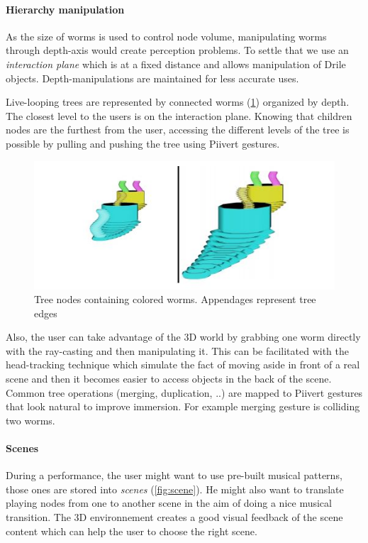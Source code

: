 \paragraph{Hierarchy manipulation}  
As the size of worms is used to control node volume, manipulating worms through depth-axis would create perception problems. To settle that we use an \textit{interaction plane} which is at a fixed distance and allows manipulation of Drile objects. Depth-manipulations are maintained for less accurate uses.

Live-looping trees are represented by connected worms (\ref{fig:worm}) organized by depth. The closest level to the users is on the interaction plane.
Knowing that children nodes are the furthest from the user, accessing the different levels of the tree is possible by pulling and pushing the tree using Piivert gestures. 

\begin{figure}[h!]
\centering\includegraphics[scale=0.55]{image/worm.JPG}
\caption{Tree nodes containing colored worms. Appendages represent tree edges}
\label{fig:worm}
\end{figure} 

 Also, the user can take advantage of the 3D world by grabbing one worm directly with the ray-casting and then manipulating it. This can be facilitated with the head-tracking technique which simulate the fact of moving aside in front of a real scene and then it becomes easier to access objects in the back of the scene. 
 Common tree operations (merging, duplication, ..) are mapped to Piivert gestures that look natural to improve immersion. For example merging gesture is colliding two worms.

\paragraph{Scenes}  

During a performance, the user might want to use pre-built musical patterns, those ones are stored into \textit{scenes} (\ref{fig:scene}). He might also want to translate playing nodes from one to another scene in the aim of doing a nice musical transition. The 3D environnement creates a good visual feedback of the scene content which can help the user to choose the right scene.

